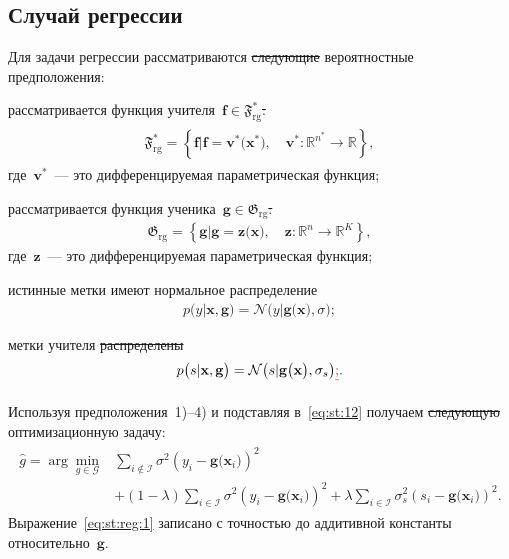 \documentclass[12pt]{a&t}
\providecommand{\DIFadd}[1]{{\protect\color{blue}\uwave{#1}}} %
\providecommand{\DIFdel}[1]{{\protect\color{red}\sout{#1}}}                      %
\providecommand{\DIFaddbegin}{} %
\providecommand{\DIFaddend}{} %
\providecommand{\DIFdelbegin}{} %
\providecommand{\DIFdelend}{} %
\newcommand{\DIFscaledelfig}{0.5}
\newlength{\DIFdelgraphicswidth} %
\newlength{\DIFdelgraphicsheight} %
\newcommand{\DIFaddincludegraphics}[2][]{{\color{blue}\fbox{\DIFOincludegraphics[#1]{#2}}}} %
\newcommand{\DIFdelincludegraphics}[2][]{%
\sbox{\DIFdelgraphicsbox}{\DIFOincludegraphics[#1]{#2}}%
\settoboxwidth{\DIFdelgraphicswidth}{\DIFdelgraphicsbox} %
\settoboxtotalheight{\DIFdelgraphicsheight}{\DIFdelgraphicsbox} %
\scalebox{\DIFscaledelfig}{%
\parbox[b]{\DIFdelgraphicswidth}{\usebox{\DIFdelgraphicsbox}\\[-\baselineskip] \rule{\DIFdelgraphicswidth}{0em}}\llap{\resizebox{\DIFdelgraphicswidth}{\DIFdelgraphicsheight}{%
\setlength{\unitlength}{\DIFdelgraphicswidth}%
\begin{picture}(1,1)%
\thicklines\linethickness{2pt} %
{\color[rgb]{1,0,0}\put(0,0){\framebox(1,1){}}}%
{\color[rgb]{1,0,0}\put(0,0){\line( 1,1){1}}}%
{\color[rgb]{1,0,0}\put(0,1){\line(1,-1){1}}}%
\end{picture}%
}\hspace*{3pt}}} %
} %
\DeclareRobustCommand{\DIFaddbegin}{\DIFOaddbegin \let\includegraphics\DIFaddincludegraphics} %
\DeclareRobustCommand{\DIFaddend}{\DIFOaddend \let\includegraphics\DIFOincludegraphics} %
\DeclareRobustCommand{\DIFdelbegin}{\DIFOdelbegin \let\includegraphics\DIFdelincludegraphics} %
\DeclareRobustCommand{\DIFdelend}{\DIFOaddend \let\includegraphics\DIFOincludegraphics} %
\begin{document}
\subsection{Случай регрессии}
Для задачи регрессии рассматриваются \DIFdelbegin \DIFdel{следующие }\DIFdelend вероятностные предположения:
\begin{enumlist}
	\item рассматривается функция учителя~$\mathbf{f}\in\mathfrak{F}_{\text{rg}}^{*}$\DIFdelbegin \DIFdel{:
	}\DIFdelend \DIFaddbegin \DIFadd{,
	}\DIFaddend \begin{gather}
	\label{eq:F:set:priv}
	\begin{aligned}
	\mathfrak{F}_{\text{rg}}^* = \left\{\mathbf{f}| \mathbf{f} = \mathbf{v}^*\bigr(\mathbf{x}^*\bigr), \quad \mathbf{v}^*: \mathbb{R}^{n^*} \to \mathbb{R} \right\},
	\end{aligned}
	\end{gather}
	где~$\mathbf{v}^*$~--- это дифференцируемая параметрическая функция;
	\item рассматривается функция ученика~$\mathbf{g}\in\mathfrak{G}_{\text{rg}}$\DIFdelbegin \DIFdel{:
}\DIFdelend \DIFaddbegin \DIFadd{,
}\DIFaddend \begin{gather}
\label{eq:G:set:rg}
\mathfrak{G}_{\text{rg}} = \left\{\mathbf{g}| \mathbf{g} = \mathbf{z}\bigr(\mathbf{x}\bigr), \quad \mathbf{z}: \mathbb{R}^n \to \mathbb{R}^K \right\},
\end{gather}
где~$\mathbf{z}$~--- это дифференцируемая параметрическая функция;
	\item истинные метки имеют нормальное распределение
	\begin{gather}
		p\bigr(y|\mathbf{x}, \mathbf{g}\bigr) = \mathcal{N}\bigr(y|\mathbf{g}\bigr(\mathbf{x}\bigr), \sigma\bigr);
	\end{gather}
	\item метки учителя \DIFdelbegin \DIFdel{распределены
	}\DIFdelend \DIFaddbegin \DIFadd{имеют распределение
	}\DIFaddend \begin{gather}
		p\bigr(s| \mathbf{x}, \mathbf{g}\bigr) = \mathcal{N}\bigr(s|\mathbf{g}\bigr(\mathbf{x}\bigr), \sigma_s\bigr)\DIFdelbegin \DIFdel{;
	}\DIFdelend \DIFaddbegin \DIFadd{.
	}\DIFaddend \end{gather}
\end{enumlist}

Используя предположения~1)--4) и подставляя в~\eqref{eq:st:12} получаем \DIFdelbegin \DIFdel{следующую }\DIFdelend оптимизационную задачу:
\begin{gather}
\label{eq:st:reg:1}
\begin{aligned}
\hat{g} = \arg\min_{g\in \mathcal{G}} & \sum_{i\not\in \mathcal{I}}\sigma^2\left(y_i-\mathbf{g}\bigr(\mathbf{x}_i\bigr)\right)^2 \\
&+ \left(1-\lambda\right)\sum_{i\in \mathcal{I}}\sigma^2\left(y_i-\mathbf{g}\bigr(\mathbf{x}_i\bigr)\right)^2 + \lambda\sum_{i\in \mathcal{I}}\sigma_s^2\left(s_i-\mathbf{g}\bigr(\mathbf{x}_i\bigr)\right)^2.
\end{aligned}
\end{gather}
Выражение~\eqref{eq:st:reg:1} записано с точностью до аддитивной константы относительно~$\mathbf{g}$. 
\end{document}
